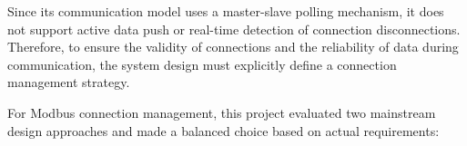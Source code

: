 \documentclass[
	english,
	ruledheaders=section,%
	class=report,%
	thesis={type=Report},%
	accentcolor=9c,%
	custommargins=true,%
	marginpar=false,%
	parskip=half-,%
	fontsize=11pt,%
	logofile={img/tuda_logo.pdf}, %
]{tudapub}
\begin{document}
Since its communication model uses a master-slave polling mechanism, it does not support active data push or real-time detection of connection disconnections. Therefore, to ensure the validity of connections and the reliability of data during communication, the system design must explicitly define a connection management strategy.

    


For Modbus connection management, this project evaluated two mainstream design approaches and made a balanced choice based on actual requirements:
\end{document}
